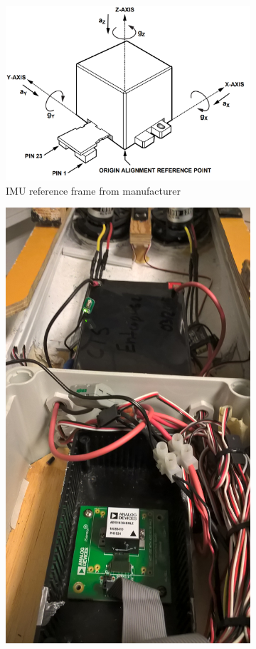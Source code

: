 \begin{figure}[htb!]
	\centering
	\begin{subfigure}{0.45\linewidth}
		\centering
		\includegraphics[width=1\linewidth]{fig/IMU_reference_frame.png}
		\caption{IMU reference frame from manufacturer}
		\label{fig:IMU_reference_frame}
	\end{subfigure}
	\begin{subfigure}{0.45\linewidth}
		\centering
		\includegraphics[width=0.9\linewidth]{fig/IMU_mounted.jpg}

\end{subfigure}
\end{figure}
